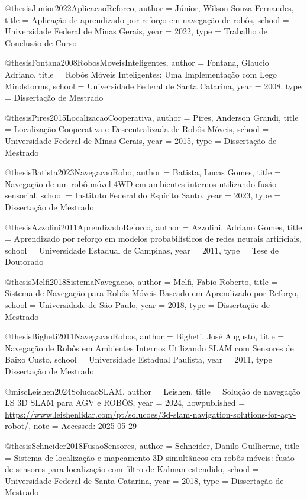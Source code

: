 @thesis{Junior2022AplicacaoReforco,
  author = {Júnior, Wilson Souza Fernandes},
  title = {Aplicação de aprendizado por reforço em navegação de robôs},
  school = {Universidade Federal de Minas Gerais},
  year = {2022},
  type = {Trabalho de Conclusão de Curso}
}

@thesis{Fontana2008RobosMoveisInteligentes,
  author = {Fontana, Glaucio Adriano},
  title = {Robôs Móveis Inteligentes: Uma Implementação com Lego Mindstorms},
  school = {Universidade Federal de Santa Catarina},
  year = {2008},
  type = {Dissertação de Mestrado}
}

@thesis{Pires2015LocalizacaoCooperativa,
  author = {Pires, Anderson Grandi},
  title = {Localização Cooperativa e Descentralizada de Robôs Móveis},
  school = {Universidade Federal de Minas Gerais},
  year = {2015},
  type = {Dissertação de Mestrado}
}

@thesis{Batista2023NavegacaoRobo,
  author = {Batista, Lucas Gomes},
  title = {Navegação de um robô móvel 4WD em ambientes internos utilizando fusão sensorial},
  school = {Instituto Federal do Espírito Santo},
  year = {2023},
  type = {Dissertação de Mestrado}
}

@thesis{Azzolini2011AprendizadoReforco,
  author = {Azzolini, Adriano Gomes},
  title = {Aprendizado por reforço em modelos probabilísticos de redes neurais artificiais},
  school = {Universidade Estadual de Campinas},
  year = {2011},
  type = {Tese de Doutorado}
}

@thesis{Melfi2018SistemaNavegacao,
  author = {Melfi, Fabio Roberto},
  title = {Sistema de Navegação para Robôs Móveis Baseado em Aprendizado por Reforço},
  school = {Universidade de São Paulo},
  year = {2018},
  type = {Dissertação de Mestrado}
}

@thesis{Bigheti2011NavegacaoRobos,
  author = {Bigheti, José Augusto},
  title = {Navegação de Robôs em Ambientes Internos Utilizando SLAM com Sensores de Baixo Custo},
  school = {Universidade Estadual Paulista},
  year = {2011},
  type = {Dissertação de Mestrado}
}

@misc{Leishen2024SolucaoSLAM,
  author = {Leishen},
  title = {Solução de navegação LS 3D SLAM para AGV e ROBÔS},
  year = {2024},
  howpublished = {\url{https://www.leishenlidar.com/pt/solucoes/3d-slam-navigation-solutions-for-agv-robot/}},
  note = {Accessed: 2025-05-29}
}

@thesis{Schneider2018FusaoSensores,
  author = {Schneider, Danilo Guilherme},
  title = {Sistema de localização e mapeamento 3D simultâneos em robôs móveis: fusão de sensores para localização com filtro de Kalman estendido},
  school = {Universidade Federal de Santa Catarina},
  year = {2018},
  type = {Dissertação de Mestrado}
}


